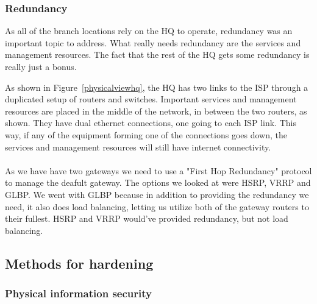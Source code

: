 
\subsubsection{Redundancy}

As all of the branch locations rely on the HQ to operate, redundancy was an important topic to address. What really needs redundancy are the services and management resources. The fact that the rest of the HQ gets some redundancy is really just a bonus.

As shown in Figure~\ref{physicalviewhq}, the HQ has two links to the ISP through a duplicated setup of routers and switches. Important services and management resources are placed in the middle of the network, in between the two routers, as shown. They have dual ethernet connections, one going to each ISP link. This way, if any of the equipment forming one of the connections goes down, the services and management resources will still have internet connectivity.
\\
\\
As we have have two gateways we need to use a "First Hop Redundancy" protocol to manage the deafult gateway. The options we looked at were HSRP, VRRP and GLBP. We went with GLBP because in addition to providing the redundancy we need, it also does load balancing, letting us utilize both of the gateway routers to their fullest. HSRP and VRRP would've provided redundancy, but not load balancing.




\subsection{Methods for hardening}

\subsubsection{Physical information security} %



